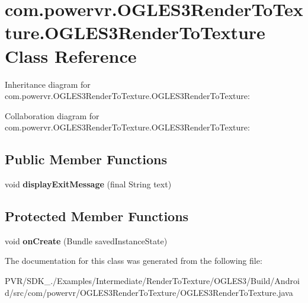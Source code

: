 \hypertarget{classcom_1_1powervr_1_1_o_g_l_e_s3_render_to_texture_1_1_o_g_l_e_s3_render_to_texture}{\section{com.\+powervr.\+O\+G\+L\+E\+S3\+Render\+To\+Texture.\+O\+G\+L\+E\+S3\+Render\+To\+Texture Class Reference}
\label{classcom_1_1powervr_1_1_o_g_l_e_s3_render_to_texture_1_1_o_g_l_e_s3_render_to_texture}
}


Inheritance diagram for com.\+powervr.\+O\+G\+L\+E\+S3\+Render\+To\+Texture.\+O\+G\+L\+E\+S3\+Render\+To\+Texture\+:


Collaboration diagram for com.\+powervr.\+O\+G\+L\+E\+S3\+Render\+To\+Texture.\+O\+G\+L\+E\+S3\+Render\+To\+Texture\+:
\subsection*{Public Member Functions}
\begin{DoxyCompactItemize}
\item 
\hypertarget{classcom_1_1powervr_1_1_o_g_l_e_s3_render_to_texture_1_1_o_g_l_e_s3_render_to_texture_ab36284fc92ad4c4cdeeb46f78b014c6e}{void {\bfseries display\+Exit\+Message} (final String text)}\label{classcom_1_1powervr_1_1_o_g_l_e_s3_render_to_texture_1_1_o_g_l_e_s3_render_to_texture_ab36284fc92ad4c4cdeeb46f78b014c6e}

\end{DoxyCompactItemize}
\subsection*{Protected Member Functions}
\begin{DoxyCompactItemize}
\item 
\hypertarget{classcom_1_1powervr_1_1_o_g_l_e_s3_render_to_texture_1_1_o_g_l_e_s3_render_to_texture_a395064f2d3f67d1c5d8dc14a1cf836af}{void {\bfseries on\+Create} (Bundle saved\+Instance\+State)}\label{classcom_1_1powervr_1_1_o_g_l_e_s3_render_to_texture_1_1_o_g_l_e_s3_render_to_texture_a395064f2d3f67d1c5d8dc14a1cf836af}

\end{DoxyCompactItemize}


The documentation for this class was generated from the following file\+:\begin{DoxyCompactItemize}
\item 
P\+V\+R/\+S\+D\+K\+\_./\+Examples/\+Intermediate/\+Render\+To\+Texture/\+O\+G\+L\+E\+S3/\+Build/\+Android/src/com/powervr/\+O\+G\+L\+E\+S3\+Render\+To\+Texture/O\+G\+L\+E\+S3\+Render\+To\+Texture.\+java\end{DoxyCompactItemize}
